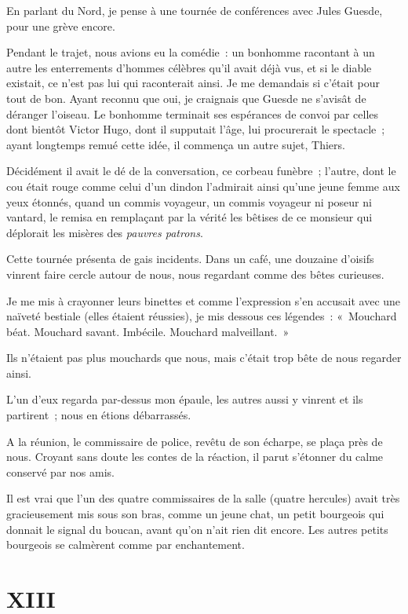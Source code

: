 \documentclass[french,twoside]{book} %
\newcommand\chapteropen{} %
\newcommand\chapterclose{} %
\begin{document}
\noindent En parlant du Nord, je pense à une tournée de  conférences avec Jules Guesde, pour une grève encore.\par
Pendant le trajet, nous avions eu la comédie : un bonhomme racontant à un autre les enterrements d’hommes célèbres qu’il avait déjà vus, et si le diable existait, ce n’est pas lui qui raconterait ainsi. Je me demandais si c’était pour tout de bon. Ayant reconnu que oui, je craignais que Guesde ne s’avisât de déranger l’oiseau. Le bonhomme terminait ses espérances de convoi par celles dont bientôt Victor Hugo, dont il supputait l’âge, lui procurerait le spectacle ; ayant longtemps remué cette idée, il commença un autre sujet, Thiers.\par
Décidément il avait le dé de la conversation, ce corbeau funèbre ; l’autre, dont le cou était rouge comme celui d’un dindon l’admirait ainsi qu’une jeune femme aux yeux étonnés, quand un commis voyageur, un commis voyageur ni poseur ni vantard, le remisa en remplaçant par la vérité les bêtises de ce monsieur qui déplorait les misères des \emph{pauvres patrons}.\par
Cette tournée présenta de gais incidents. Dans un café, une douzaine d’oisifs vinrent faire cercle autour de nous, nous regardant comme des bêtes curieuses.\par
Je me mis à crayonner leurs binettes et  comme l’expression s’en accusait avec une naïveté bestiale (elles étaient réussies), je mis dessous ces légendes : « Mouchard béat. Mouchard savant. Imbécile. Mouchard malveillant. »\par
Ils n’étaient pas plus mouchards que nous, mais c’était trop bête de nous regarder ainsi.\par
L’un d’eux regarda par-dessus mon épaule, les autres aussi y vinrent et ils partirent ; nous en étions débarrassés.\par
A la réunion, le commissaire de police, revêtu de son écharpe, se plaça près de nous. Croyant sans doute les contes de la réaction, il parut s’étonner du calme conservé par nos amis.\par
Il est vrai que l’un des quatre commissaires de la salle (quatre hercules) avait très gracieusement mis sous son bras, comme un jeune chat, un petit bourgeois qui donnait le signal du boucan, avant qu’on n’ait rien dit encore. Les autres petits bourgeois se calmèrent comme par enchantement.
\chapterclose


\chapteropen
 \chapter[{XIII}]{XIII}
\label{p2.13}
\end{document}
